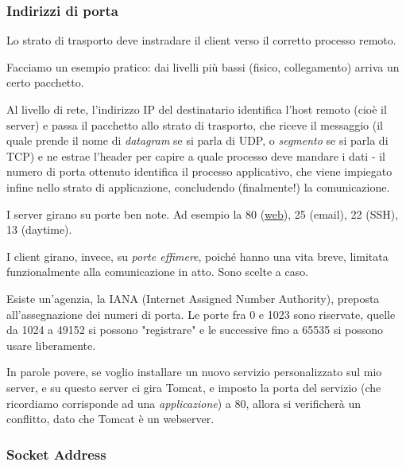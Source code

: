         \subsubsection{Indirizzi di porta}
        
            Lo strato di trasporto deve instradare il client verso il corretto processo remoto. 
            
            \vspace{3mm}
            
            Facciamo un esempio pratico: dai livelli più bassi (fisico, collegamento) arriva un certo pacchetto. 
            
            Al livello di rete, l'indirizzo IP del destinatario identifica l'host remoto (cioè il server) e passa il pacchetto allo strato di trasporto, che riceve il messaggio (il quale prende il nome di \textit{datagram} se si parla di UDP, o \textit{segmento} se si parla di TCP) e ne estrae l'header per capire a quale processo deve mandare i dati - il numero di porta ottenuto identifica il processo applicativo, che viene impiegato infine nello strato di applicazione, concludendo (finalmente!) la comunicazione.
            
            \vspace{3mm}
            
            I server girano su porte ben note. Ad esempio la 80 (\underline{web}), 25 (email), 22 (SSH), 13 (daytime).
            
            I client girano, invece, su \textit{porte effimere}, poiché hanno una vita breve, limitata funzionalmente alla comunicazione in atto. Sono scelte a caso.
            
            \vspace{3mm}
            
            Esiste un'agenzia, la IANA (Internet Assigned Number Authority), preposta all'assegnazione dei numeri di porta. Le porte fra 0 e 1023 sono riservate, quelle da 1024 a 49152 si possono "registrare" e le successive fino a 65535 si possono usare liberamente. 
            
            In parole povere, se voglio installare un nuovo servizio personalizzato sul mio server, e su questo server ci gira Tomcat, e imposto la porta del servizio (che ricordiamo corrisponde ad una \textit{applicazione}) a 80, allora si verificherà un conflitto, dato che Tomcat è un webserver.
        
        \subsubsection{Socket Address}
        
